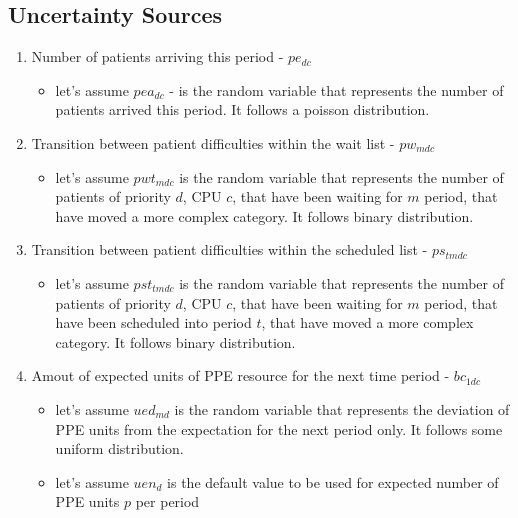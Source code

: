 \documentclass{article}
\begin{document}
\subsection{Uncertainty Sources}
\begin{enumerate}
    	
	\item Number of patients arriving this period - $pe_{dc}$
		\begin{itemize}
			\item let's assume $pea_{dc}$ - is the random variable that represents the number of patients arrived this period. It follows a poisson distribution.
		\end{itemize}
	
	\item Transition between patient difficulties within the wait list - $pw_{mdc}$
		\begin{itemize}
			\item let's assume $pwt_{mdc}$ is the random variable that represents the number of patients of priority $d$, CPU $c$, that have been waiting for $m$ period, that have moved a more complex category. It follows binary distribution.
		\end{itemize}
		
	\item Transition between patient difficulties within the scheduled list - $ps_{tmdc}$
		\begin{itemize}
			\item let's assume $pst_{tmdc}$ is the random variable that represents the number of patients of priority $d$, CPU $c$, that have been waiting for $m$ period, that have been scheduled into period $t$, that have moved a more complex category. It follows binary distribution.
		\end{itemize}

	\item Amout of expected units of PPE resource for the next time period - $bc_{1dc}$
		\begin{itemize}
			\item let's assume $ued_{md}$ is the random variable that represents the deviation of PPE units from the expectation for the next period only. It follows some uniform distribution.
			\item let's assume $uen_{d}$ is the default value to be used for expected number of PPE units $p$ per period
		\end{itemize}
\end{enumerate}
\end{document}
